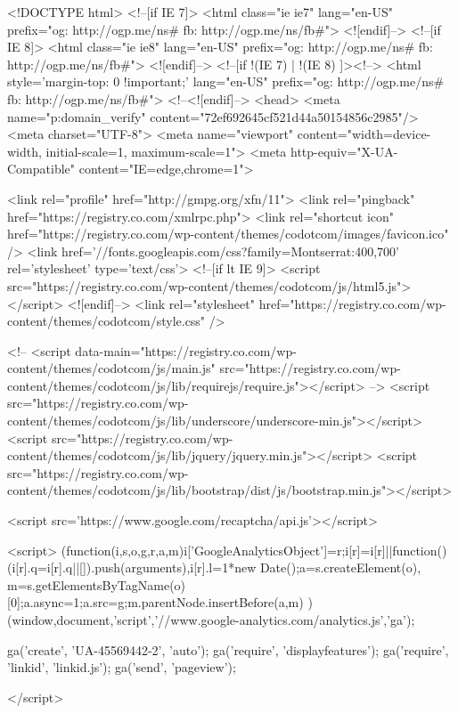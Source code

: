 <!DOCTYPE html>
<!--[if IE 7]>
<html class="ie ie7" lang="en-US" prefix="og: http://ogp.me/ns# fb: http://ogp.me/ns/fb#">
<![endif]-->
<!--[if IE 8]>
<html class="ie ie8" lang="en-US" prefix="og: http://ogp.me/ns# fb: http://ogp.me/ns/fb#">
<![endif]-->
<!--[if !(IE 7) | !(IE 8)  ]><!-->
<html style='margin-top: 0 !important;' lang="en-US" prefix="og: http://ogp.me/ns# fb: http://ogp.me/ns/fb#">
<!--<![endif]-->
<head>
    <meta name="p:domain_verify" content="72ef692645cf521d44a50154856c2985"/>
	<meta charset="UTF-8">
	<meta name="viewport" content="width=device-width, initial-scale=1, maximum-scale=1">
    <meta http-equiv="X-UA-Compatible" content="IE=edge,chrome=1">
	
	<link rel="profile" href="http://gmpg.org/xfn/11">
	<link rel="pingback" href="https://registry.co.com/xmlrpc.php">
    <link rel="shortcut icon" href="https://registry.co.com/wp-content/themes/codotcom/images/favicon.ico" />
    <link href='//fonts.googleapis.com/css?family=Montserrat:400,700' rel='stylesheet' type='text/css'>
	<!--[if lt IE 9]>
	<script src="https://registry.co.com/wp-content/themes/codotcom/js/html5.js"></script>
	<![endif]-->
    <link rel="stylesheet" href="https://registry.co.com/wp-content/themes/codotcom/style.css" />

    <!--
    <script data-main="https://registry.co.com/wp-content/themes/codotcom/js/main.js" src="https://registry.co.com/wp-content/themes/codotcom/js/lib/requirejs/require.js"></script>
    -->
    <script src="https://registry.co.com/wp-content/themes/codotcom/js/lib/underscore/underscore-min.js"></script>
    <script src="https://registry.co.com/wp-content/themes/codotcom/js/lib/jquery/jquery.min.js"></script>
    <script src="https://registry.co.com/wp-content/themes/codotcom/js/lib/bootstrap/dist/js/bootstrap.min.js"></script>

    <script src='https://www.google.com/recaptcha/api.js'></script>

    <script>
      (function(i,s,o,g,r,a,m){i['GoogleAnalyticsObject']=r;i[r]=i[r]||function(){
      (i[r].q=i[r].q||[]).push(arguments)},i[r].l=1*new Date();a=s.createElement(o),
      m=s.getElementsByTagName(o)[0];a.async=1;a.src=g;m.parentNode.insertBefore(a,m)
      })(window,document,'script','//www.google-analytics.com/analytics.js','ga');

      ga('create', 'UA-45569442-2', 'auto');
      ga('require', 'displayfeatures');
      ga('require', 'linkid', 'linkid.js');
      ga('send', 'pageview');

    </script>

